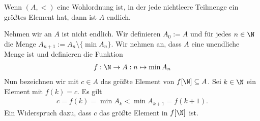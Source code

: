 
\begin{exercise}[237]
	Wenn $(A, <)$ eine Wohlordnung ist, in der jede nichtleere Teilmenge ein größtes Element hat, dann ist $A$ endlich.

\end{exercise}


\begin{solution}
	Nehmen wir an $A$ ist nicht endlich. Wir definieren $A_0 := A$ und für jedes $n \in \N$ die Menge $A_{n + 1} := A_n \setminus \{\min A_n\}$. Wir nehmen an, dass $A$ eine unendliche Menge ist und definieren die Funktion
	\begin{align*}
		f:\N \to A: n \mapsto \min A_n
	\end{align*}
	Nun bezeichnen wir mit $c \in A$ das größte Element von $f[\N] \subseteq A$. Sei $k \in \N$ ein Element mit $f(k) = c$. Es gilt
	\begin{align*}
		c = f(k) = \min A_k < \min A_{k + 1} = f(k + 1).
	\end{align*}
	Ein Widerspruch dazu, dass $c$ das größte Element in $f[\N]$ ist.

\end{solution}
